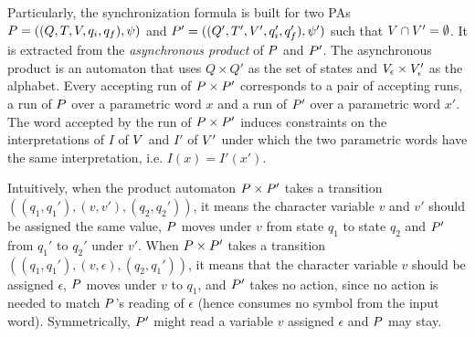 \documentclass[sigplan,review,anonymous]{acmart}\settopmatter{printfolios=true,printccs=false,printacmref=false}
\begin{document}
Particularly, the synchronization formula is built for two PAs  
$P = ((Q,T,V,q_i,q_f),\psi)$ and ${P'} = ((Q',T',V',q_i',q_f'),\psi')$ such that $V \cap V' = \emptyset$. 
%
It is extracted from the \emph{asynchronous product} of $P$ and $P'$. 
%
The asynchronous product is an automaton that uses $Q\times Q'$ as the set of states and 
$V_\epsilon\times V'_\epsilon$
as the alphabet. 
%
Every accepting run of $P \times P'$ corresponds to a pair of accepting runs, 
a run of $P$ over a parametric word $x$ and a run of ${P'}$ over a parametric word $x'$. 
The word accepted by the run of $P \times P'$ induces constraints on the interpretations of $I$ of $V$ and $I'$ of $V'$ under which the two parametric words have the same interpretation, i.e. $I(x) = I'(x')$. 

Intuitively, when the product automaton $P \times P'$ takes a transition $((q_1,q_1'), (v,v'),(q_2,q_2'))$, 
it means the character variable $v$ and $v'$ should be assigned the same value,
$P$ moves under $v$ from state $q_1$ to state $q_2$ and ${P'}$ from $q_1'$ to $q_2'$ under $v'$.
%
When $P \times P'$ takes a transition $((q_1,q_1'), (v,\epsilon),(q_2,q_1'))$, 
it means that the character variable $v$ should be assigned $\epsilon$, 
$P$ moves under $v$ to $q_1$, and ${P'}$ takes no action, since no action is needed to match $P$'s reading of $\epsilon$ (hence consumes no symbol from the input word). Symmetrically, ${P'}$ might read a variable $v$ assigned $\epsilon$ and $P$ may stay.
\end{document}
